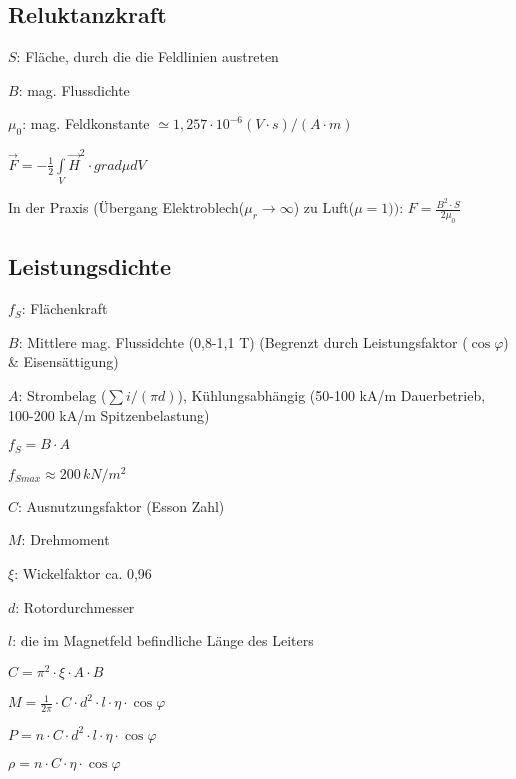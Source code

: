 \documentclass[german]{latex4ei/latex4ei_sheet}
\begin{document}
\begin{sectionbox}
				\subsection{Reluktanzkraft}
					\begin{symbolbox}
						\item $S$: Fläche, durch die die Feldlinien austreten
						\item $B$: mag. Flussdichte
						\item $\mu_0$: mag. Feldkonstante $\simeq 1,257\cdot 10^{-6}(V\cdot s)/(A\cdot m)$
						\item $\vec{F} = -\frac{1}{2}\int\limits_V \vec{H}^2 \cdot grad \mu dV$
						\item In der Praxis (Übergang Elektroblech($\mu_r \rightarrow\infty$) zu Luft($\mu =  1))$: $F = \frac{B^2\cdot S}{2\mu_0}$
					\end{symbolbox}
				\end{sectionbox}

				\begin{sectionbox}
					\subsection{Leistungsdichte}
						\begin{bluebox}
							\item $f_S$: Flächenkraft
							\item $B$: Mittlere mag. Flussidchte (0,8-1,1 T) (Begrenzt durch Leistungsfaktor ($\cos \varphi$) \& Eisensättigung)
							\item $A$: Strombelag ($\sum i/(\pi d)$), Kühlungsabhängig (50-100 kA/m Dauerbetrieb, 100-200 kA/m Spitzenbelastung)
							\item $f_S = B\cdot A$
							\item $f_{Smax} \approx 200\, kN/m^2$
							\item $C$: Ausnutzungsfaktor (Esson Zahl)
							\item $M$: Drehmoment
							\item $\xi$: Wickelfaktor ca. 0,96
							\item $d$: Rotordurchmesser
							\item $l$: die im Magnetfeld befindliche Länge des Leiters
							\item $C = \pi^2 \cdot \xi\cdot A \cdot B$
							\item $M = \frac{1}{2\pi}\cdot C\cdot d^2\cdot l \cdot \eta \cdot \cos \varphi$
							\item $P = n \cdot C \cdot d^2 \cdot l \cdot \eta \cdot \cos \varphi$
							\item $\rho = n \cdot C \cdot \eta\cdot \cos \varphi$
						\end{bluebox}
				\end{sectionbox}
\end{document}
